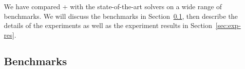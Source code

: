 
We have compared {\ostrich}+ with the state-of-the-art solvers on a wide range of benchmarks.  We will discuss the benchmarks in Section~\ref{sec:bench}, then describe the details of the experiments as well as the experiment results in Section~\ref{sec:exp-res}.



\subsection{Benchmarks}\label{sec:bench}
 


